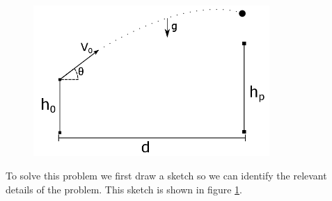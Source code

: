 \documentclass[11pt]{article}
\begin{document}
\begin{figure}
\centering
\includegraphics[width=0.8\textwidth]{Figure.png}
\caption{}
\label{figure}
\end{figure}

To solve this problem we first draw a sketch so we can identify the relevant details of the 
problem. This sketch is shown in figure \ref{figure}.
\end{document}
